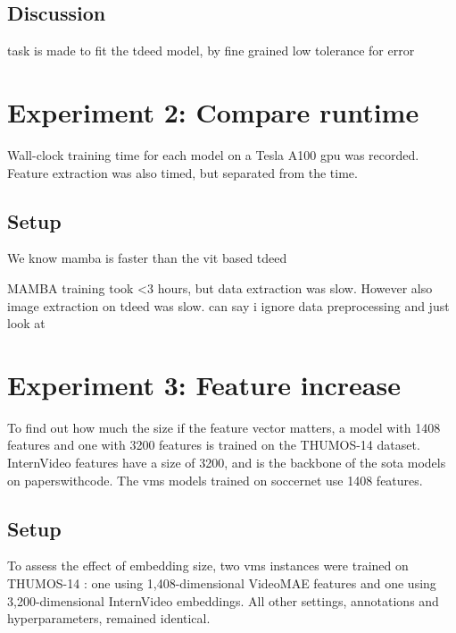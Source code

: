 \subsection{Discussion}
\label{ssec:ex1_discussion}

task is made to fit the tdeed model, by fine grained low tolerance for error 

\section{Experiment 2: Compare runtime}
\label{sec:experiment2}

Wall-clock training time for each model on a Tesla A100 \acrshort{gpu} was recorded. Feature extraction was also timed, but separated from the time. 

\subsection{Setup}
\label{ssec:ex2_setup}

We know mamba is faster than the vit based tdeed

MAMBA training took <3 hours, but data extraction was slow. However also image extraction on tdeed was slow. can say i ignore data preprocessing and just look at 


\section{Experiment 3: Feature increase}
\label{sec:experiment3}
To find out how much the size if the feature vector matters, a model with 1408 features and one with 3200 features is trained on the THUMOS-14 dataset.
InternVideo features have a size of 3200, and is the backbone of the \acrshort{sota} models on paperswithcode.
The \acrshort{vms} models trained on soccernet use 1408 features. 


\subsection{Setup}
\label{ssec:ex3_setup}

To assess the effect of embedding size, two \acrshort{vms} instances were trained on THUMOS-14 \cite{dataset:thumos}: one using 1,408-dimensional VideoMAE features and one using 3,200-dimensional InternVideo embeddings. All other settings, annotations and hyperparameters, remained identical.

